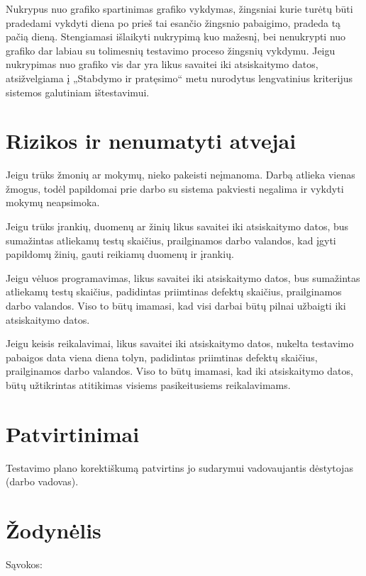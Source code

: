 \documentclass{VUMIFPSkursinis}
\begin{document}
    Nukrypus nuo grafiko spartinimas grafiko vykdymas, žingsniai kurie turėtų būti pradedami vykdyti diena po prieš tai esančio žingsnio pabaigimo, pradeda tą pačią dieną. 
    Stengiamasi išlaikyti nukrypimą kuo mažesnį, bei nenukrypti nuo grafiko dar labiau su tolimesnių testavimo proceso žingsnių vykdymu. 
    Jeigu nukrypimas  nuo grafiko vis dar yra likus savaitei iki atsiskaitymo datos, atsižvelgiama į „Stabdymo ir pratęsimo“ metu nurodytus lengvatinius kriterijus sistemos galutiniam ištestavimui.

    \section{Rizikos ir nenumatyti atvejai}

    Jeigu trūks žmonių ar mokymų, nieko pakeisti neįmanoma. Darbą atlieka vienas žmogus, todėl papildomai prie darbo su sistema pakviesti negalima ir vykdyti mokymų neapsimoka. 

    Jeigu trūks įrankių, duomenų ar žinių likus savaitei iki atsiskaitymo datos, bus sumažintas atliekamų testų skaičius, prailginamos darbo valandos, kad įgyti papildomų žinių, gauti reikiamų duomenų ir įrankių.

    Jeigu vėluos programavimas, likus savaitei iki atsiskaitymo datos, bus sumažintas atliekamų testų skaičius, padidintas priimtinas defektų skaičius, prailginamos darbo valandos. Viso to būtų imamasi, kad visi darbai būtų pilnai užbaigti iki atsiskaitymo datos.

    Jeigu keisis reikalavimai, likus savaitei iki atsiskaitymo datos, nukelta testavimo pabaigos data viena diena tolyn, padidintas priimtinas defektų skaičius, prailginamos darbo valandos. Viso to būtų imamasi, kad iki atsiskaitymo datos, būtų užtikrintas atitikimas visiems pasikeitusiems reikalavimams.

    \section{Patvirtinimai}

    Testavimo plano korektiškumą patvirtins jo sudarymui vadovaujantis dėstytojas (darbo vadovas).

    \section{Žodynėlis}

    Sąvokos:
\end{document}
